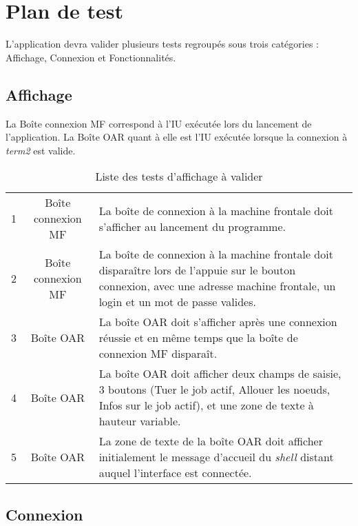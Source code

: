 
\section{Plan de test}
\label{sec:plan-de-test}

\par L'application devra valider plusieurs tests regroupés sous trois catégories : Affichage, Connexion et Fonctionnalités.

\subsection{Affichage}
\label{sec:affichage}

\par La Boîte connexion MF correspond à l'IU exécutée lors du lancement de l'application. La Boîte OAR quant à elle est l'IU exécutée lorsque la connexion à \emph{term2} est valide.

\begin{table}[h!]
  \centering
  \begin{tabular}{|c|c|p{10cm}|}
    \hline
    1 & Boîte connexion MF & La boîte de connexion à la machine frontale doit s'afficher au lancement du programme. \\
    2 & Boîte connexion MF & La boîte de connexion à la machine frontale doit disparaître lors de l'appuie sur le bouton connexion, avec une adresse machine frontale, un login et un mot de passe valides.\\
    3 & Boîte OAR & La boîte OAR doit s'afficher après une connexion réussie et en même temps que la boîte de connexion MF disparaît. \\
    4 & Boîte OAR & La boîte OAR doit afficher deux champs de saisie, 3 boutons (Tuer le job actif, Allouer les noeuds, Infos sur le job actif), et une zone de texte à hauteur variable. \\
    5 & Boîte OAR & La zone de texte de la boîte OAR doit afficher initialement le message d'accueil du \emph{shell} distant auquel l'interface est connectée. \\

    \hline    
  \end{tabular}
  \caption{Liste des tests d'affichage à valider}
  \label{tab:tests_affichage}
\end{table}

\subsection{Connexion}
\label{sec:connexion}

